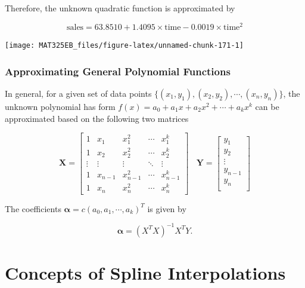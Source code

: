 \documentclass[
]{book}
\begin{document}
Therefore, the unknown quadratic function is approximated by

\[
\text{sales} = 63.8510 + 1.4095\times \text{time} -0.0019\times \text{time}^2
\]

\begin{center}\texttt{[image: MAT325EB\_files/figure-latex/unnamed-chunk-171-1]} \end{center}

\hfill\break

\hypertarget{approximating-general-polynomial-functions}{%
\subsection{Approximating General Polynomial Functions}\label{approximating-general-polynomial-functions}}

In general, for a given set of data points \(\{(x_1, y_1), (x_2, y_2), \cdots, (x_n, y_n)\}\), the unknown polynomial has form \(f(x) = a_0 + a_1 x + a_2x^2 + \cdots + a_kx^k\) can be approximated based on the following two matrices

\[
\mathbf{X} = \left[
\begin{array}{cccccc}
1 & x_1 & x_1^2 & \cdots & x^k_1 \\
1 & x_2 & x_2^2 & \cdots & x^k_2 \\
\vdots & \vdots & \vdots& \ddots & \vdots \\
1 & x_{n-1} & x_{n-1}^2 & \cdots & x^k_{n-1} \\
1 & x_n & x_n^2 & \cdots & x^k_n 
\end{array}
\right]
~~~~
\mathbf{Y} = \left[
\begin{array}{c}
y_1 \\
y_2 \\
\vdots \\
y_{n-1} \\
y_n \\
\end{array}
\right]
\]

The coefficients \(\mathbf{\alpha} = c(a_0, a_1, \cdots, a_k)^T\) is given by

\[
\mathbf{\alpha} = (X^TX)^{-1}X^TY.
\]

\hypertarget{concepts-of-spline-interpolations}{%
\chapter{Concepts of Spline Interpolations}\label{concepts-of-spline-interpolations}}
\end{document}
